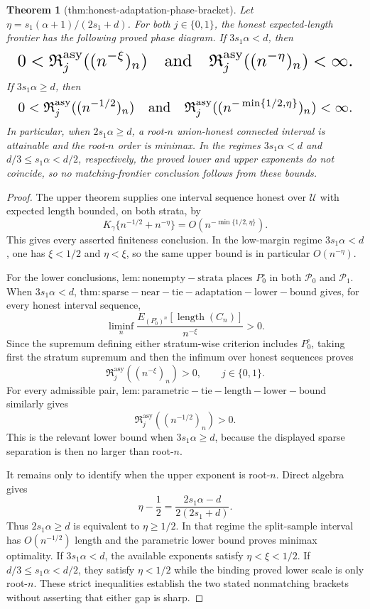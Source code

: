 \documentclass{article}
\newtheorem{theorem}{Theorem}
\begin{document}
\begin{theorem}[thm:honest-adaptation-phase-bracket]\label{thm:honest-adaptation-phase-bracket}
Let \(\eta=s_1(\alpha+1)/(2s_1+d)\).  For both \(j\in\{0,1\}\), the honest expected-length frontier has the following proved phase diagram.  If \(3s_1\alpha<d\), then
\[
\makebox[\linewidth][c]{\resizebox{0.98\linewidth}{!}{\(\displaystyle 0<\mathfrak R_j^{\mathrm{asy}}((n^{-\xi})_n)
 \quad\text{and}\quad
 \mathfrak R_j^{\mathrm{asy}}((n^{-\eta})_n)<\infty.\)}}
\]
If \(3s_1\alpha\ge d\), then
\[
\makebox[\linewidth][c]{\resizebox{0.98\linewidth}{!}{\(\displaystyle 0<\mathfrak R_j^{\mathrm{asy}}((n^{-1/2})_n)
 \quad\text{and}\quad
 \mathfrak R_j^{\mathrm{asy}}((n^{-\min\{1/2,\eta\}})_n)<\infty.\)}}
\]
In particular, when \(2s_1\alpha\ge d\), a root-\(n\) union-honest connected interval is attainable and the root-\(n\) order is minimax.  In the regimes \(3s_1\alpha<d\) and \(d/3\le s_1\alpha<d/2\), respectively, the proved lower and upper exponents do not coincide, so no matching-frontier conclusion follows from these bounds.
\end{theorem}
\begin{proof}
The upper theorem supplies one interval sequence honest over \(\mathcal U\) with expected length bounded, on both strata, by
\[
 K_\gamma\{n^{-1/2}+n^{-\eta}\}
 =O(n^{-\min\{1/2,\eta\}}).
\]
This gives every asserted finiteness conclusion.  In the low-margin regime \(3s_1\alpha<d\), one has \(\xi<1/2\) and \(\eta<\xi\), so the same upper bound is in particular \(O(n^{-\eta})\).

For the lower conclusions, \(\mathrm{lem:nonempty-strata}\) places \(P_0^\circ\) in both \(\mathcal P_0\) and \(\mathcal P_1\).  When \(3s_1\alpha<d\), \(\mathrm{thm:sparse-near-tie-adaptation-lower-bound}\) gives, for every honest interval sequence,
\[
 \liminf_n
 \frac{E_{(P_0^\circ)^n}[\operatorname{length}(C_n)]}{n^{-\xi}}>0.
\]
Since the supremum defining either stratum-wise criterion includes \(P_0^\circ\), taking first the stratum supremum and then the infimum over honest sequences proves
\[
 \mathfrak R_j^{\mathrm{asy}}((n^{-\xi})_n)>0,
 \qquad j\in\{0,1\}.
\]
For every admissible pair, \(\mathrm{lem:parametric-tie-length-lower-bound}\) similarly gives
\[
 \mathfrak R_j^{\mathrm{asy}}((n^{-1/2})_n)>0.
\]
This is the relevant lower bound when \(3s_1\alpha\ge d\), because the displayed sparse separation is then no larger than root-\(n\).

It remains only to identify when the upper exponent is root-\(n\).  Direct algebra gives
\[
 \eta-\frac12
 =\frac{2s_1\alpha-d}{2(2s_1+d)}.
\]
Thus \(2s_1\alpha\ge d\) is equivalent to \(\eta\ge1/2\).  In that regime the split-sample interval has \(O(n^{-1/2})\) length and the parametric lower bound proves minimax optimality.  If \(3s_1\alpha<d\), the available exponents satisfy \(\eta<\xi<1/2\).  If \(d/3\le s_1\alpha<d/2\), they satisfy \(\eta<1/2\) while the binding proved lower scale is only root-\(n\).  These strict inequalities establish the two stated nonmatching brackets without asserting that either gap is sharp.
\end{proof}
\end{document}
